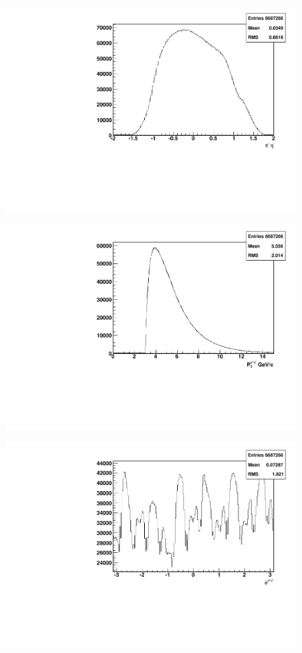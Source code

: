 \documentclass[abstract = on,listof=totoc, bibliography=totoc]{scrreprt}
\newcommand{\pip}{\pi^+}
\newcommand{\pim}{\pi^-}
\newcommand{\pair}{$\pip\pim$ }
\begin{document}
\begin{figure}
\begin{center}
\includegraphics[width = .8\textwidth]{hNegEta}
\caption[$\eta$ distribution of $\pi^-$]{}
\label{fig:}
\end{center}
\end{figure}

\begin{figure}
\begin{center}
\includegraphics[width = .8\textwidth]{hPtPair}
\caption[$P_{T}$ distribution of \pair pair]{}
\label{fig:}
\end{center}
\end{figure}

\begin{figure}
\begin{center}
\includegraphics[width = .8\textwidth]{hPhiPair}
\caption[$\phi$ distribution of \pair pair]{}
\label{fig:}
\end{center}
\end{figure}
\end{document}
